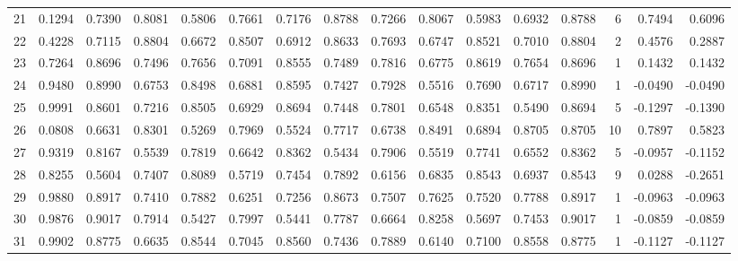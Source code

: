 \begin{tabular}{lrrrrrrrrrrrrrrr}
21  &      0.1294 &  0.7390 &  0.8081 &  0.5806 &  0.7661 &  0.7176 &  0.8788 &  0.7266 &  0.8067 &  0.5983 &   0.6932 &     0.8788 &      6 &                    0.7494 &                     0.6096 \\
22  &      0.4228 &  0.7115 &  0.8804 &  0.6672 &  0.8507 &  0.6912 &  0.8633 &  0.7693 &  0.6747 &  0.8521 &   0.7010 &     0.8804 &      2 &                    0.4576 &                     0.2887 \\
23  &      0.7264 &  0.8696 &  0.7496 &  0.7656 &  0.7091 &  0.8555 &  0.7489 &  0.7816 &  0.6775 &  0.8619 &   0.7654 &     0.8696 &      1 &                    0.1432 &                     0.1432 \\
24  &      0.9480 &  0.8990 &  0.6753 &  0.8498 &  0.6881 &  0.8595 &  0.7427 &  0.7928 &  0.5516 &  0.7690 &   0.6717 &     0.8990 &      1 &                   -0.0490 &                    -0.0490 \\
25  &      0.9991 &  0.8601 &  0.7216 &  0.8505 &  0.6929 &  0.8694 &  0.7448 &  0.7801 &  0.6548 &  0.8351 &   0.5490 &     0.8694 &      5 &                   -0.1297 &                    -0.1390 \\
26  &      0.0808 &  0.6631 &  0.8301 &  0.5269 &  0.7969 &  0.5524 &  0.7717 &  0.6738 &  0.8491 &  0.6894 &   0.8705 &     0.8705 &     10 &                    0.7897 &                     0.5823 \\
27  &      0.9319 &  0.8167 &  0.5539 &  0.7819 &  0.6642 &  0.8362 &  0.5434 &  0.7906 &  0.5519 &  0.7741 &   0.6552 &     0.8362 &      5 &                   -0.0957 &                    -0.1152 \\
28  &      0.8255 &  0.5604 &  0.7407 &  0.8089 &  0.5719 &  0.7454 &  0.7892 &  0.6156 &  0.6835 &  0.8543 &   0.6937 &     0.8543 &      9 &                    0.0288 &                    -0.2651 \\
29  &      0.9880 &  0.8917 &  0.7410 &  0.7882 &  0.6251 &  0.7256 &  0.8673 &  0.7507 &  0.7625 &  0.7520 &   0.7788 &     0.8917 &      1 &                   -0.0963 &                    -0.0963 \\
30  &      0.9876 &  0.9017 &  0.7914 &  0.5427 &  0.7997 &  0.5441 &  0.7787 &  0.6664 &  0.8258 &  0.5697 &   0.7453 &     0.9017 &      1 &                   -0.0859 &                    -0.0859 \\
31  &      0.9902 &  0.8775 &  0.6635 &  0.8544 &  0.7045 &  0.8560 &  0.7436 &  0.7889 &  0.6140 &  0.7100 &   0.8558 &     0.8775 &      1 &                   -0.1127 &                    -0.1127 \\

\end{tabular}
